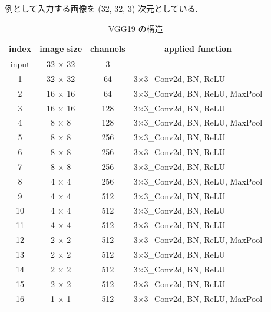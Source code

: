 \begin{table}[t]
  \begin{center}
    \caption{VGG19 の構造}
		\vspace{-1mm}
    例として入力する画像を (32, 32, 3) 次元としている.
		\vspace{1mm}
		\vspace{3mm}
    \begin{tabular}{|c|c|c|l|}
    \hline
    \textbf{index} & \textbf{image size} & \textbf{channels} & \multicolumn{1}{c|}{\textbf{applied function}} \\ \hline
    input & 32 $\times$ 32 & 3   & \multicolumn{1}{c|}{-}         \\ \hline
    1     & 32 $\times$ 32 & 64  & 3$\times$3\_Conv2d, BN, ReLU          \\ \hline
    2     & 16 $\times$ 16 & 64  & 3$\times$3\_Conv2d, BN, ReLU, MaxPool \\ \hline
    3     & 16 $\times$ 16 & 128 & 3$\times$3\_Conv2d, BN, ReLU          \\ \hline
    4     & 8 $\times$ 8   & 128 & 3$\times$3\_Conv2d, BN, ReLU, MaxPool \\ \hline
    5     & 8 $\times$ 8   & 256 & 3$\times$3\_Conv2d, BN, ReLU          \\ \hline
    6     & 8 $\times$ 8   & 256 & 3$\times$3\_Conv2d, BN, ReLU          \\ \hline
    7     & 8 $\times$ 8   & 256 & 3$\times$3\_Conv2d, BN, ReLU          \\ \hline
    8     & 4 $\times$ 4   & 256 & 3$\times$3\_Conv2d, BN, ReLU, MaxPool \\ \hline
    9     & 4 $\times$ 4   & 512 & 3$\times$3\_Conv2d, BN, ReLU          \\ \hline
    10    & 4 $\times$ 4   & 512 & 3$\times$3\_Conv2d, BN, ReLU          \\ \hline
    11    & 4 $\times$ 4   & 512 & 3$\times$3\_Conv2d, BN, ReLU          \\ \hline
    12    & 2 $\times$ 2   & 512 & 3$\times$3\_Conv2d, BN, ReLU, MaxPool \\ \hline
    13    & 2 $\times$ 2   & 512 & 3$\times$3\_Conv2d, BN, ReLU          \\ \hline
    14    & 2 $\times$ 2   & 512 & 3$\times$3\_Conv2d, BN, ReLU          \\ \hline
    15    & 2 $\times$ 2   & 512 & 3$\times$3\_Conv2d, BN, ReLU          \\ \hline
    16    & 1 $\times$ 1   & 512 & 3$\times$3\_Conv2d, BN, ReLU, MaxPool \\ \hline
    \end{tabular}
    \label{tab:vgg}
  \end{center}
\end{table}


